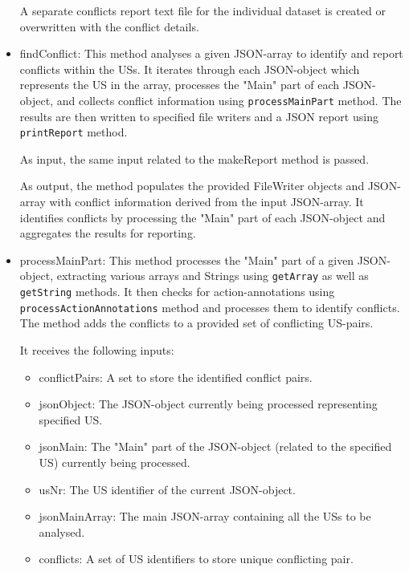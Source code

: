 \begin{itemize}
	A separate conflicts report text file for the individual dataset is created or overwritten with the conflict details.
	
	\item findConflict: This method analyses a given JSON-array to identify and report conflicts within the USs. It iterates through each JSON-object which represents the US in the array, processes the "Main" part of each JSON-object, and collects conflict information using \texttt{processMainPart} method. The results are then written to specified file writers and a JSON report using \texttt{printReport} method.
	
	As input, the same input related to the makeReport method is passed.
	
	As output, the method populates the provided FileWriter objects and JSON-array with conflict information derived from the input JSON-array. It identifies conflicts by processing the "Main" part of each JSON-object and aggregates the results for reporting.
	
	\item processMainPart: This method processes the "Main" part of a given JSON-object, extracting various arrays and Strings using \texttt{getArray} as well as \texttt{getString} methods. It then checks for action-annotations using \texttt{processActionAnnotations} method and processes them to identify conflicts. The method adds the conflicts to a provided set of conflicting US-pairs.
	
	It receives the following inputs:
	\begin{itemize}
		\item conflictPairs: A set to store the identified conflict pairs.
		
		\item jsonObject: The JSON-object currently being processed representing specified US.
		
		\item jsonMain: The "Main" part of the JSON-object (related to the specified US) currently being processed.
		
		\item usNr: The US identifier of the current JSON-object.
		
		\item jsonMainArray: The main JSON-array containing all the USs to be analysed.
		
		\item conflicts: A set of US identifiers to store unique conflicting pair.
				

\end{itemize}
\end{itemize}
